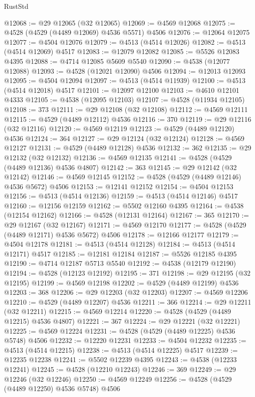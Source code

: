 \begin{lexlean}{RustStd}
\begin{coremodule}
@12068 := @29 @12065 (@32 @12065)
@12069 := @4569 @12068
@12075 := @4528 (@4529 (@4489 @12069) @4536 @5571) @4506
@12076 := @12064 @12075
@12077 := @4504 @12076
@12079 := @4513 (@4514 @12026)
@12082 := @4513 (@4514 @12069) @4517
@12083 := @12079 @12082
@12085 := @5526 @12083 @4395
@12088 := @4714 @12085 @5609 @5540
@12090 := @4538 (@12077 @12088)
@12093 := @4528 (@12021 @12090) @4506
@12094 := @12013 @12093
@12095 := @4504 @12094
@12097 := @4513 (@4514 @11939)
@12100 := @4513 (@4514 @12018) @4517
@12101 := @12097 @12100
@12103 := @4610 @12101 @4333
@12105 := @4538 (@12095 @12103)
@12107 := @4528 (@11934 @12105)
@12108 := 373
@12111 := @29 @12108 (@32 @12108)
@12112 := @4569 @12111
@12115 := @4529 (@4489 @12112) @4536
@12116 := 370
@12119 := @29 @12116 (@32 @12116)
@12120 := @4569 @12119
@12123 := @4529 (@4489 @12120) @4536
@12124 := 364
@12127 := @29 @12124 (@32 @12124)
@12128 := @4569 @12127
@12131 := @4529 (@4489 @12128) @4536
@12132 := 362
@12135 := @29 @12132 (@32 @12132)
@12136 := @4569 @12135
@12141 := @4528 (@4529 (@4489 @12136) @4536 @4807)
@12142 := 363
@12145 := @29 @12142 (@32 @12142)
@12146 := @4569 @12145
@12152 := @4528 (@4529 (@4489 @12146) @4536 @5672) @4506
@12153 := @12141 @12152
@12154 := @4504 @12153
@12156 := @4513 (@4514 @12136)
@12159 := @4513 (@4514 @12146) @4517
@12160 := @12156 @12159
@12162 := @5502 @12160 @4395
@12164 := @4538 (@12154 @12162)
@12166 := @4528 (@12131 @12164)
@12167 := 365
@12170 := @29 @12167 (@32 @12167)
@12171 := @4569 @12170
@12177 := @4528 (@4529 (@4489 @12171) @4536 @5672) @4506
@12178 := @12166 @12177
@12179 := @4504 @12178
@12181 := @4513 (@4514 @12128)
@12184 := @4513 (@4514 @12171) @4517
@12185 := @12181 @12184
@12187 := @5526 @12185 @4395
@12190 := @4714 @12187 @5713 @5540
@12192 := @4538 (@12179 @12190)
@12194 := @4528 (@12123 @12192)
@12195 := 371
@12198 := @29 @12195 (@32 @12195)
@12199 := @4569 @12198
@12202 := @4529 (@4489 @12199) @4536
@12203 := 368
@12206 := @29 @12203 (@32 @12203)
@12207 := @4569 @12206
@12210 := @4529 (@4489 @12207) @4536
@12211 := 366
@12214 := @29 @12211 (@32 @12211)
@12215 := @4569 @12214
@12220 := @4528 (@4529 (@4489 @12215) @4536 @4807)
@12221 := 367
@12224 := @29 @12221 (@32 @12221)
@12225 := @4569 @12224
@12231 := @4528 (@4529 (@4489 @12225) @4536 @5748) @4506
@12232 := @12220 @12231
@12233 := @4504 @12232
@12235 := @4513 (@4514 @12215)
@12238 := @4513 (@4514 @12225) @4517
@12239 := @12235 @12238
@12241 := @5502 @12239 @4395
@12243 := @4538 (@12233 @12241)
@12245 := @4528 (@12210 @12243)
@12246 := 369
@12249 := @29 @12246 (@32 @12246)
@12250 := @4569 @12249
@12256 := @4528 (@4529 (@4489 @12250) @4536 @5748) @4506

\end{coremodule}
\end{lexlean}
